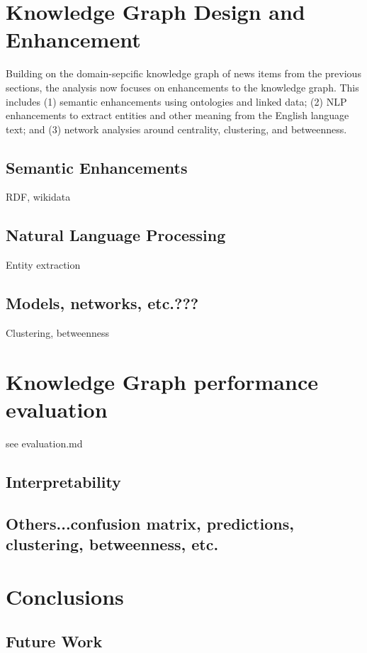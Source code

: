 \documentclass[11pt]{article}
\begin{document}
\section{Knowledge Graph Design and Enhancement}

Building on the domain-sepcific knowledge graph of news items from the previous sections, the analysis now focuses on enhancements to the knowledge graph. This includes (1) semantic enhancements using ontologies and linked data; (2) NLP enhancements to extract entities and other meaning from the English language text; and (3) network analysies around centrality, clustering, and betweenness. 

\subsection{Semantic Enhancements}

RDF, wikidata

\subsection{Natural Language Processing}

Entity extraction

\subsection{Models, networks, etc.???}

Clustering, betweenness

\section{Knowledge Graph performance evaluation}

see evaluation.md

\subsection{Interpretability}
\subsection{Others...confusion matrix, predictions, clustering, betweenness, etc.}

\section{Conclusions}
\subsection{Future Work}
\end{document}
